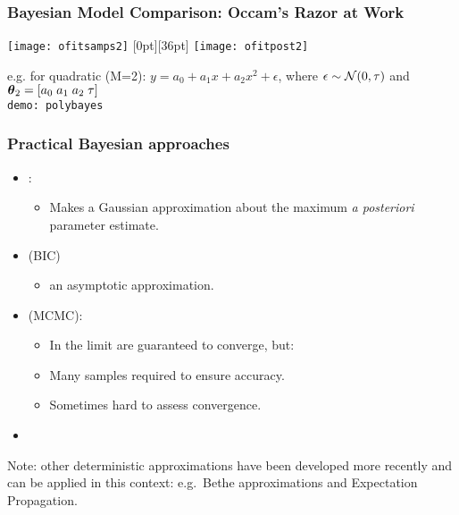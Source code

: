 \begin{frame}

\frametitle{Bayesian Model Comparison: \normalsize Occam's Razor at Work }

\vspace{0.1\oin}
\centerline{\texttt{[image: ofitsamps2]} 
\raisebox{36pt}[0pt][36pt]{
\texttt{[image: ofitpost2]}}}

\vspace*{-4ex}
e.g. for quadratic (M=2): $ y = a_0 + a_1 x + a_2 x^2 + \epsilon$,
where $\epsilon \sim {\cal   N}(0,\tau)$ and $\boldsymbol{\theta}_2 = [a_0 \; a_1
\; a_2 \; \tau]$ \\[1ex]
{\tt demo: polybayes}
\end{frame}
\begin{frame}
\frametitle{Practical Bayesian approaches}
\vspace{8pt}

\begin{itemize}
 \item {}: 
        \begin{itemize}
         \item Makes a Gaussian approximation about the maximum {\em a
                posteriori} parameter estimate. \end{itemize}   
    \item {} (BIC)
        \begin{itemize}
	\item  an  asymptotic approximation. \end{itemize}
    \item {} (MCMC):
    \begin{itemize}
         \item In the limit are guaranteed to converge, but:
        \item Many samples required to ensure accuracy.
        \item Sometimes hard to assess convergence. \end{itemize}
    \item  {}
\end{itemize}

\vspace*{0.6\oin}
Note: other deterministic approximations have been developed more
recently and can be applied in this context:  e.g.\ Bethe
approximations and Expectation Propagation.

\vfill

\end{frame}
